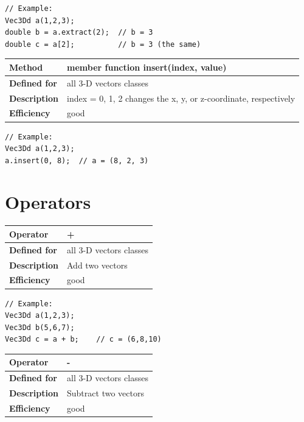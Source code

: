 \documentclass[11pt,a4paper,oneside,openright]{report}
\newcommand{\vspacesmall}{\vspace{3mm}}
\newcommand{\vspacebig}{\vspace{6mm}}
\begin{document}
\begin{lstlisting}[frame=none]
// Example:
Vec3Dd a(1,2,3);
double b = a.extract(2);  // b = 3
double c = a[2];          // b = 3 (the same)
\end{lstlisting}
\vspacebig

\begin{tabular}{|p{25mm}|p{100mm}|}
\hline
\bfseries Method & member function insert(index, value) \\ \hline
\bfseries Defined for & all 3-D vectors classes \\ \hline
\bfseries Description & index = 0, 1, 2 changes the x, y, or z-coordinate, respectively \\ \hline
\bfseries Efficiency & good \\ \hline
\end{tabular}
\vspacesmall

\begin{lstlisting}[frame=none]
// Example:
Vec3Dd a(1,2,3);
a.insert(0, 8);  // a = (8, 2, 3)
\end{lstlisting}
\vspacebig


\chapter{Operators}\label{chap:Operators}

\begin{tabular}{|p{25mm}|p{100mm}|}
\hline
\bfseries Operator & + \\ \hline
\bfseries Defined for & all 3-D vectors classes  \\ \hline
\bfseries Description & Add two vectors \\ \hline
\bfseries Efficiency & good \\ \hline
\end{tabular}
\vspacesmall

\begin{lstlisting}[frame=none]
// Example:
Vec3Dd a(1,2,3);
Vec3Dd b(5,6,7);
Vec3Dd c = a + b;    // c = (6,8,10)
\end{lstlisting}
\vspacebig


\begin{tabular}{|p{25mm}|p{100mm}|}
\hline
\bfseries Operator & - \\ \hline
\bfseries Defined for & all 3-D vectors classes  \\ \hline
\bfseries Description & Subtract two vectors \\ \hline
\bfseries Efficiency & good \\ \hline
\end{tabular}
\vspacesmall
\end{document}
